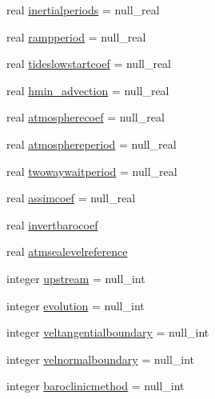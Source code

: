\begin{DoxyCompactItemize}
real \mbox{\hyperlink{structmodulehydrodynamic_1_1t__hydrooptions_a717ec957d80babbadb2dbbbdbbd1c2cb}{inertialperiods}} = null\+\_\+real
\item 
real \mbox{\hyperlink{structmodulehydrodynamic_1_1t__hydrooptions_a5a65e24bc8a2d8000dbca9b760b0cd4e}{rampperiod}} = null\+\_\+real
\item 
real \mbox{\hyperlink{structmodulehydrodynamic_1_1t__hydrooptions_a1d8b28697a8b502d97cb36a6383464eb}{tideslowstartcoef}} = null\+\_\+real
\item 
real \mbox{\hyperlink{structmodulehydrodynamic_1_1t__hydrooptions_a52c042bcd675dbe006f3caf83576c290}{hmin\+\_\+advection}} = null\+\_\+real
\item 
real \mbox{\hyperlink{structmodulehydrodynamic_1_1t__hydrooptions_a65b2854c071dcecd4691d95300e3b1c6}{atmospherecoef}} = null\+\_\+real
\item 
real \mbox{\hyperlink{structmodulehydrodynamic_1_1t__hydrooptions_a1dc4d22e49a75016650ffe79632d14cf}{atmosphereperiod}} = null\+\_\+real
\item 
real \mbox{\hyperlink{structmodulehydrodynamic_1_1t__hydrooptions_a62106e14f3cba2b3a8bf4fc517472f1b}{twowaywaitperiod}} = null\+\_\+real
\item 
real \mbox{\hyperlink{structmodulehydrodynamic_1_1t__hydrooptions_a47eeb15b86cc08f6c575cf97b4fbbd3c}{assimcoef}} = null\+\_\+real
\item 
real \mbox{\hyperlink{structmodulehydrodynamic_1_1t__hydrooptions_a3910368e0f3e3c9920f0814f97eafc1e}{invertbarocoef}}
\item 
real \mbox{\hyperlink{structmodulehydrodynamic_1_1t__hydrooptions_abe7038353ecab7418150a1bd1ceeac83}{atmsealevelreference}}
\item 
integer \mbox{\hyperlink{structmodulehydrodynamic_1_1t__hydrooptions_a24970f405506ebc1ec8992008905dab9}{upstream}} = null\+\_\+int
\item 
integer \mbox{\hyperlink{structmodulehydrodynamic_1_1t__hydrooptions_a69e6efaab72ea07ae13d8bf00112f54a}{evolution}} = null\+\_\+int
\item 
integer \mbox{\hyperlink{structmodulehydrodynamic_1_1t__hydrooptions_a4214aed1e5e6564db0e2685592ac5a9c}{veltangentialboundary}} = null\+\_\+int
\item 
integer \mbox{\hyperlink{structmodulehydrodynamic_1_1t__hydrooptions_a79972fb03e4957449d71cea2c06e0fda}{velnormalboundary}} = null\+\_\+int
\item 
integer \mbox{\hyperlink{structmodulehydrodynamic_1_1t__hydrooptions_af95f7a8e83ca2ae1b901d0e325096d72}{baroclinicmethod}} = null\+\_\+int

\end{DoxyCompactItemize}
